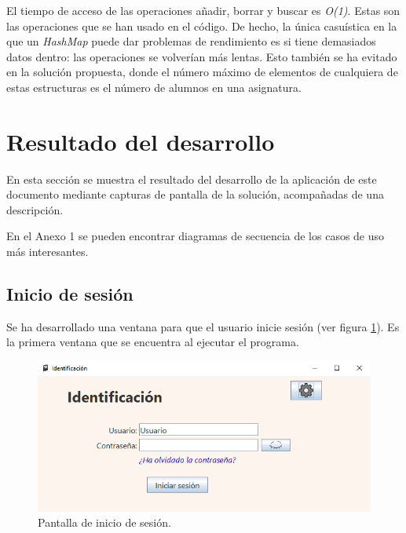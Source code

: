 El tiempo de acceso de las operaciones añadir, borrar y buscar es \textit{O(1)}. Estas son las operaciones que se han usado en el código. De hecho, la única casuística en la que un \textit{HashMap} puede dar problemas de rendimiento es si tiene demasiados datos dentro: las operaciones se volverían más lentas. Esto también se ha evitado en la solución propuesta, donde el número máximo de elementos de cualquiera de estas estructuras es el número de alumnos en una asignatura.

\section{Resultado del desarrollo}
En esta sección se muestra el resultado del desarrollo de la aplicación de este documento mediante capturas de pantalla de la solución, acompañadas de una descripción.

En el Anexo 1 se pueden encontrar diagramas de secuencia de los casos de uso más interesantes.

\subsection{Inicio de sesión}
Se ha desarrollado una ventana para que el usuario inicie sesión (ver figura \ref{Fig:login}). Es la primera ventana que se encuentra al ejecutar el programa.

\begin{figure}[h]
\centering\includegraphics[width=1\linewidth]{figs/login.png}
\caption{Pantalla de inicio de sesión.}
\label{Fig:login}
\end{figure}

